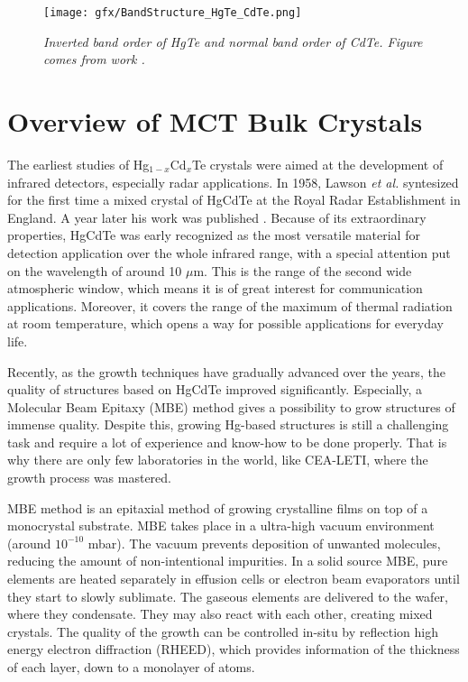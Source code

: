 \documentclass[titlepage,a4paper]{book}
\newcommand{\wciecie}{\quad\phantom{v}}
\begin{document}
\begin{figure}[ht]
	\centering
	\texttt{[image: gfx/BandStructure\_HgTe\_CdTe.png]}
	\vspace{-10pt}
	\caption{\textit{Inverted band order of HgTe and normal band order of CdTe. Figure comes from work \cite{Bernevig_Topology2}.}}
	\label{fig:BandStructure_HgTe_CdTe}
\end{figure} 

\clearpage
\section{Overview of MCT Bulk Crystals}
\wciecie
The earliest studies of Hg$_{1-x}$Cd$_x$Te crystals were aimed at the development of infrared detectors, especially radar applications. In 1958, Lawson \textit{et al.} syntesized for the first time a mixed crystal of HgCdTe at the Royal Radar Establishment in England. A year later his work was published \cite{Lawson_MCT}. Because of its extraordinary properties, HgCdTe was early recognized as the most versatile material for detection application over the whole infrared range, with a special attention put on the wavelength of around 10 $\mu$m. This is the range of the second wide atmospheric window, which means it is of great interest for communication applications. Moreover, it covers the range of the maximum of thermal radiation at room temperature, which opens a way for possible applications for everyday life. 

Recently, as the growth techniques have gradually advanced over the years, the quality of structures based on HgCdTe improved significantly. Especially, a Molecular Beam Epitaxy (MBE) method gives a possibility to grow structures of immense quality. Despite this, growing Hg-based structures is still a challenging task and require a lot of experience and know-how to be done properly. That is why there are only few laboratories in the world, like CEA-LETI, where the growth process was mastered.

MBE method is an epitaxial method of growing crystalline films on top of a monocrystal substrate. MBE takes place in a ultra-high vacuum environment (around $10^{-10}$ mbar). The vacuum prevents deposition of unwanted molecules, reducing the amount of non-intentional impurities. In a solid source MBE, pure elements are heated separately in effusion cells or electron beam evaporators until they start to slowly sublimate. The gaseous elements are delivered to the wafer, where they condensate. They may also react with each other, creating mixed crystals. The quality of the growth can be controlled in-situ by reflection high energy electron diffraction (RHEED), which provides information of the thickness of each layer, down to a monolayer of atoms.  
\end{document}
